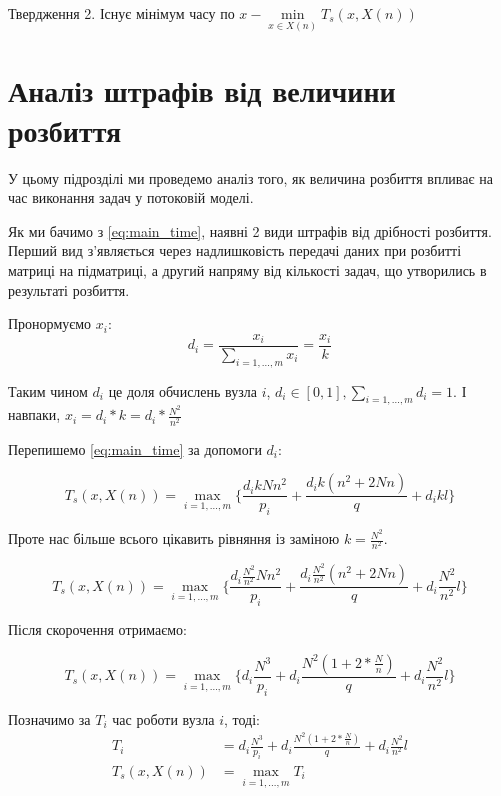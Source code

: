 Твердження 2. Існує мінімум часу по $x - \min\limits_{x \in X(n)} T_s(x, X(n))$

\section{Аналіз штрафів від величини розбиття}

У цьому підрозділі ми проведемо аналіз того, як величина розбиття впливає на час виконання задач у потоковій моделі.

Як ми бачимо з \ref{eq:main_time}, наявні 2 види штрафів від дрібності розбиття. Перший вид з'являється через надлишковість передачі даних при розбитті матриці на підматриці, а другий напряму від кількості задач, що утворились в результаті розбиття.

Пронормуємо $x_i$:
\begin{equation}
	\label{eq:d_i}
	d_i = \frac{x_i}{\sum\limits_{i=1,\ldots,m} x_i} = \frac{x_i}{k}
\end{equation}

Таким чином $d_i$ це доля обчислень вузла $i$, $d_i \in [0, 1], \sum\limits_{i=1,\ldots,m} d_i = 1$. І навпаки, $x_i = d_i * k = d_i * \frac{N^2}{n^2}$

Перепишемо \ref{eq:main_time} за допомоги $d_i$:

\begin{equation}
	\label{eq:main_time_d_i}
	T_s(x,X(n)) = \max\limits_{i=1,\ldots,m} \bigg\{ \frac{d_i k N n^2}{p_i} + \frac{d_i k(n^2 + 2 N n )}{q} + d_i k l \bigg\}
\end{equation}

Проте нас більше всього цікавить рівняння із заміною $k = \frac{N^2}{n^2}$.

\begin{equation}
\label{eq:main_time_d_i_2}
T_s(x,X(n)) = \max\limits_{i=1,\ldots,m} \bigg\{ \frac{d_i \frac{N^2}{n^2} N n^2}{p_i} + \frac{d_i \frac{N^2}{n^2}(n^2 + 2 N n )}{q} + d_i \frac{N^2}{n^2} l \bigg\}
\end{equation}

Після скорочення отримаємо:

\begin{equation}
\label{eq:main_time_d_i_final}
T_s(x,X(n)) = \max\limits_{i=1,\ldots,m} \bigg\{ d_i \frac{N^3}{p_i} + d_i \frac{N^2 ( 1 + 2*\frac{N}{n} )}{q} + d_i \frac{N^2}{n^2} l \bigg\}
\end{equation}

Позначимо за $T_i$ час роботи вузла $i$, тоді:
\begin{equation}
	\begin{aligned} 
		T_i &= d_i \frac{N^3}{p_i} + d_i \frac{N^2 ( 1 + 2*\frac{N}{n} )}{q} + d_i \frac{N^2}{n^2} l \\
		T_s(x,X(n)) &= \max\limits_{i=1,\ldots,m} T_i
	\end{aligned} 
\end{equation}

